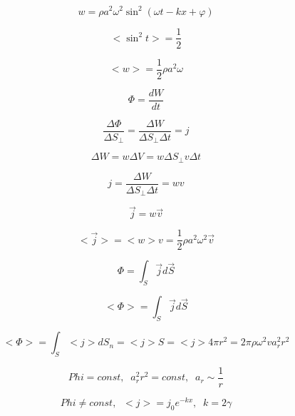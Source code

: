 \documentclass{article}
\begin{document}
	\begin{equation}
		w = \rho a^2\omega^2\sin^2(\omega t - kx + \varphi)
	\end{equation}

	\begin{equation}
		 <\sin^2 t>=\frac{1}{2}
	\end{equation}

	\begin{equation}
		<w> = \frac{1}{2}\rho a^2\omega
	\end{equation} 

	\begin{equation}
		\Phi = \frac{dW}{dt}
	\end{equation}

	\begin{equation}
		\frac{\Delta\Phi}{\Delta S_\perp} = \frac{\Delta W}{\Delta S_\perp\Delta t} = j
	\end{equation}

	\begin{equation}
		\Delta W = w\Delta V = w\Delta S_\perp v\Delta t
	\end{equation}

	\begin{equation}
		j = \frac{\Delta W}{\Delta S_\perp\Delta t} = wv
	\end{equation}

	\begin{equation}
		\vec j = w\vec v
	\end{equation}

	\begin{equation}
		<\vec j> = <w>v = \frac{1}{2}\rho a^2 \omega^2 \vec v
	\end{equation}

	\begin{equation}
		\Phi = \int_S\vec j d\vec S
	\end{equation}

	\begin{equation}
		<\Phi> = \int_S \vec jd\vec S
	\end{equation}

	\begin{equation}
		<\Phi>=\int_S <j>dS_n = <j>S = <j>4\pi r^2= 2\pi\rho\omega^2 v a_r^2 r^2
	\end{equation}

	\begin{equation}
		Phi = const,\;\;a_r^2r^2 = const,\;\;a_r\sim\frac{1}{r}
	\end{equation}

	\begin{equation}
		Phi\neq const,\;\;<j> = j_0e^{-kx},\;\;k=2\gamma
	\end{equation}
\end{document}

